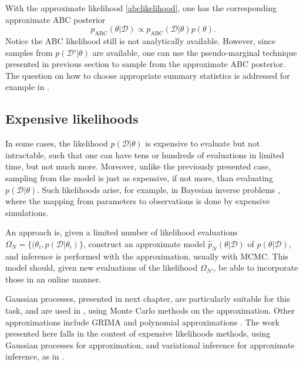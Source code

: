 With the approximate likelihood \eqref{abclikelihood}, one has the corresponding approximate ABC posterior
\begin{equation}
 p_{\text{ABC}}(\theta|\mathcal{D}) \propto p_{\text{ABC}}(\mathcal{D}|\theta) p(\theta).
\end{equation}
Notice the ABC likelihood still is not analytically available. However, since samples from $p(\mathcal{D}'|\theta)$ are available, one can use the pseudo-marginal technique presented in previous section to sample from the approximate ABC posterior. The question on how to choose appropriate summary statistics is addressed for example in \cite{Fearnhead_2012}.

\subsection{Expensive likelihoods}
In some cases, the likelihood $p(\mathcal{D}|\theta)$ is expensive to evaluate but not intractable, such that one can have tens or hundreds of evaluations in limited time, but not much more. Moreover, unlike the previously presented case, sampling from the model is just as expensive, if not more, than evaluating $p(\mathcal{D}|\theta)$. Such likelihoods arise, for example, in Bayesian inverse problems \cite{Tarantola_2004}, where the mapping from parameters to observations is done by expensive simulations.

An approach is, given a limited number of likelihood evaluations $\Omega_N = \{(\theta_i,p(\mathcal{D}|\theta_i)\}$, construct an approximate model $\hat{p}_N(\theta|\mathcal{D})$ of $p(\theta|\mathcal{D})$, and inference is performed with the approximation, usually with MCMC. This model should, given new evaluations of the likelihood $\Omega_{N'}$, be able to incorporate those in an online manner.

Gaussian processes, presented in next chapter, are particularly suitable for this task, and are used in \cite{Rasmussen_2003,Wang_2018_2,Bilionis_2013,Kandasamy_2015,Conrad_2016}, using Monte Carlo methods on the approximation. Other approximations include GRIMA \cite{Bliznyuk_2012} and polynomial approximations \cite{Marzouk_2007}. The work presented here falls in the contest of expensive likelihoods methods, using Gaussian processes for approximation, and variational inference for approximate inference, as in \cite{Acerbi_2018}.
